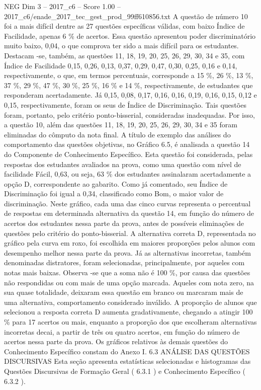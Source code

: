 \begin{textsample}{NEG Dim 3 – 2017\_c6 – Score 1.00 – 2017\_c6/enade\_2017\_tec\_gest\_prod\_99ff610856.txt}
A questão de número 10 foi a mais difícil dentre as 27 questões específicas válidas, com baixo Índice de Facilidade, apenas 6 \% de acertos.
Essa questão apresentou poder discriminatório muito baixo, 0,04, o que comprova ter sido a mais difícil para os estudantes.
Destacam -se, também, as questões 11, 18, 19, 20, 25, 26, 29, 30, 34 e 35, com Índice de Facilidade 0,15, 0,26, 0,13, 0,37, 0,29, 0,47, 0,30, 0,25, 0,16 e 0,14, respectivamente, o que, em termos percentuais, corresponde a 15 \%, 26 \%, 13 \%, 37 \%, 29 \%, 47 \%, 30 \%, 25 \%, 16 \% e 14 \%, respectivamente, de estudantes que responderam acertadamente.
Já 0,15, 0,08, 0,17, 0,16, 0,16, 0,19, 0,16, 0,15, 0,12 e 0,15, respectivamente, foram os seus de Índice de Discriminação.
Tais questões foram, portanto, pelo critério ponto-bisserial, consideradas inadequadas.
Por isso, a questão 10, além das questões 11, 18, 19, 20, 25, 26, 29, 30, 34 e 35 foram eliminadas do cômputo da nota final.
A título de exemplo das análises do comportamento das questões objetivas, no Gráfico 6.5, é analisada a questão 14 do Componente de Conhecimento Específico.
Esta questão foi considerada, pelas respostas dos estudantes avaliados na prova, como uma questão com nível de facilidade Fácil, 0,63, ou seja, 63 \% dos estudantes assinalaram acertadamente a opção D, correspondente ao gabarito.
Como já comentado, seu Índice de Discriminação foi igual a 0,34, classificado como Bom, o maior valor de discriminação.
Neste gráfico, cada uma das cinco curvas representa o percentual de respostas em determinada alternativa da questão 14, em função do número de acertos dos estudantes nessa parte da prova, antes de possíveis eliminações de questões pelo critério do ponto-bisserial.
A alternativa correta D, representada no gráfico pela curva em roxo, foi escolhida em maiores proporções pelos alunos com desempenho melhor nessa parte da prova.
Já as alternativas incorretas, também denominadas distratores, foram selecionadas, principalmente, por aqueles com notas mais baixas.
Observa -se que a soma não é 100 \%, por causa das questões não respondidas ou com mais de uma opção marcada.
Aqueles com nota zero, na sua quase totalidade, deixaram essa questão em branco ou marcaram mais de uma alternativa, comportamento considerado inválido.
A proporção de alunos que selecionou a resposta correta D aumenta gradativamente, chegando a atingir 100 \% para 17 acertos ou mais, enquanto a proporção dos que escolheram alternativas incorretas decai, a partir de três ou quatro acertos, em função do número de acertos nessa parte da prova.
Os gráficos relativos às demais questões do Conhecimento Específico constam do Anexo I. 6.3 ANÁLISE DAS QUESTÕES DISCURSIVAS Esta seção apresenta estatísticas selecionadas e histogramas das Questões Discursivas de Formação Geral ( 6.3.1 ) e Conhecimento Específico ( 6.3.2 ).

\end{textsample}
